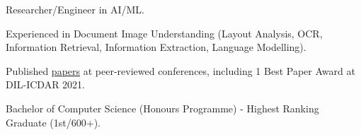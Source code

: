 % 
\vspace{.6em}
\begin{zitemize}
    \item Researcher/Engineer in AI/ML.
    \item Experienced in Document Image Understanding (Layout Analysis, OCR,
    Information Retrieval, Information Extraction, Language Modelling).
    \item Published \href{https://scholar.google.com/citations?user=\gscholarid}{papers} at
    peer-reviewed conferences, including 1 Best Paper Award at DIL-ICDAR 2021.
    \item Bachelor of Computer Science (Honours Programme) - Highest Ranking Graduate (1st/600+).
\end{zitemize}
